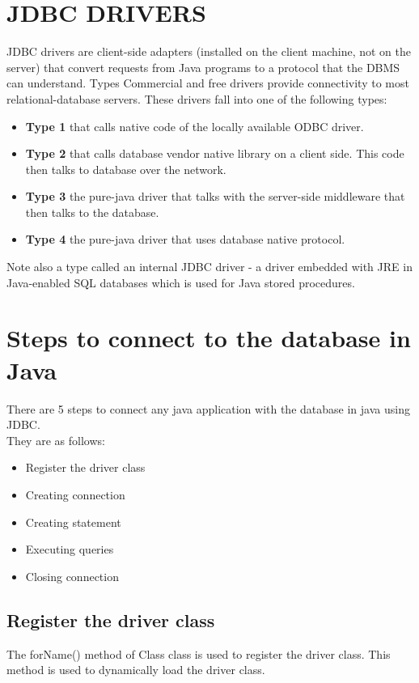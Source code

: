 \section{JDBC DRIVERS}
JDBC drivers are client-side adapters (installed on the client machine, not on the server) that convert requests from Java programs to a protocol that the DBMS can understand. Types Commercial and free drivers provide connectivity to most relational-database servers. These drivers fall into one of the following types:
\begin{itemize}
	\item \textbf{Type 1} that calls native code of the locally available ODBC driver.
	\item \textbf{Type 2} that calls database vendor native library on a client side. This code then talks to database over the network.
	\item \textbf{Type 3} the pure-java driver that talks with the server-side middleware that then talks to the database.
	\item \textbf{Type 4} the pure-java driver that uses database native protocol.
\end{itemize}
Note also a type called an internal JDBC driver - a driver embedded with JRE in Java-enabled SQL databases which is used for Java stored procedures.

\thispagestyle{fancy}
\section{Steps to connect to the database in Java}
There are 5 steps to connect any java application with the database in java using JDBC.\\

They are as follows:
\begin{itemize}
\item Register the driver class
\item Creating connection
\item Creating statement
\item Executing queries
\item Closing connection
\end{itemize}

\subsection{Register the driver class}
The forName() method of Class class is used to register the driver class. This method is used to dynamically load the driver class.\\

